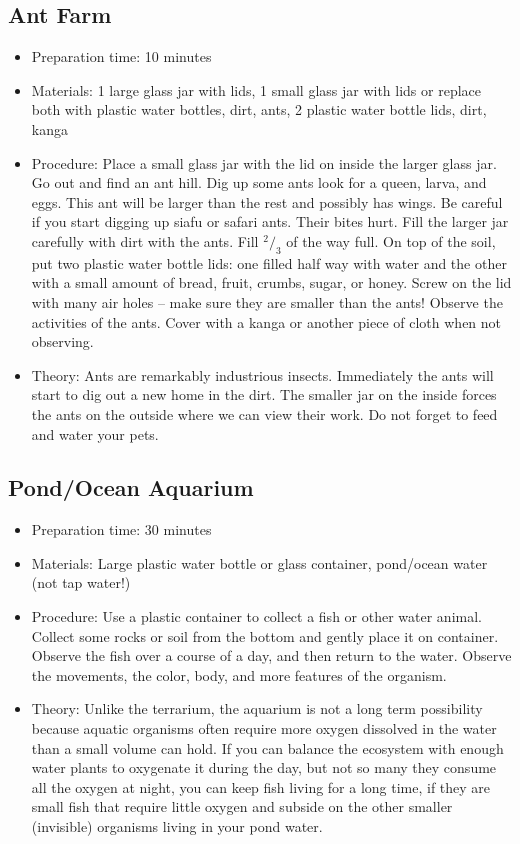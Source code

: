 \subsection{Ant Farm}
\begin{itemize}
\item{Preparation time: 10 minutes}
\item{Materials: 1 large glass jar with lids, 1 small glass jar with lids or replace both with plastic water bottles, dirt, ants, 2 plastic water bottle lids, dirt, kanga}
\item{Procedure: Place a small glass jar with the lid on inside the larger glass jar. Go out and find an ant hill. Dig up some ants look for a queen, larva, and eggs. This ant will be larger than the rest and possibly has wings. Be careful if you start digging up siafu or safari ants. Their bites hurt. Fill the larger jar carefully with dirt with the ants. Fill $^2/_3$ of the way full. On top of the soil, put two plastic water bottle lids: one filled half way with water and the other with a small amount of bread, fruit, crumbs, sugar, or honey. Screw on the lid with many air holes -- make sure they are smaller than the ants! Observe the activities of the ants. Cover with a kanga or another piece of cloth when not observing.}
\item{Theory: Ants are remarkably industrious insects. Immediately the ants will start to dig out a new home in the dirt. The smaller jar on the inside forces the ants on the outside where we can view their work. Do not forget to feed and water your pets.}
\end{itemize}

\subsection{Pond\slash Ocean Aquarium}
\begin{itemize}
\item{Preparation time: 30 minutes}
\item{Materials: Large plastic water bottle or glass container, pond\slash ocean water (not tap water!)}
\item{Procedure: Use a plastic container to collect a fish or other water animal. Collect some rocks or soil from the bottom and gently place it on container. Observe the fish over a course of a day, and then return to the water. Observe the movements, the color, body, and more features of the organism.}
\item{Theory: Unlike the terrarium, the aquarium is not a long term possibility because aquatic organisms often require more oxygen dissolved in the water than a small volume can hold. If you can balance the ecosystem with enough water plants to oxygenate it during the day, but not so many they consume all the oxygen at night, you can keep fish living for a long time, if they are small fish that require little oxygen and subside on the other smaller (invisible) organisms living in your pond water.}
\end{itemize}

